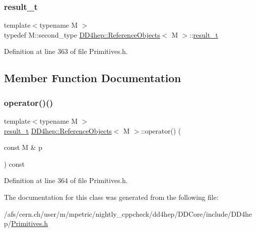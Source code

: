 \subsubsection{\texorpdfstring{result\+\_\+t}{result\_t}}
{\footnotesize\ttfamily template$<$typename M $>$ \\
typedef M\+::second\+\_\+type \hyperlink{class_d_d4hep_1_1_reference_objects}{D\+D4hep\+::\+Reference\+Objects}$<$ M $>$\+::\hyperlink{class_d_d4hep_1_1_reference_objects_a32009de947d7ac402ba08bf9a626c5aa}{result\+\_\+t}}



Definition at line 363 of file Primitives.\+h.



\subsection{Member Function Documentation}
\hypertarget{class_d_d4hep_1_1_reference_objects_a83c729cd863b298a0857bc859df124a0}{}\label{class_d_d4hep_1_1_reference_objects_a83c729cd863b298a0857bc859df124a0} 
\subsubsection{\texorpdfstring{operator()()}{operator()()}}
{\footnotesize\ttfamily template$<$typename M $>$ \\
\hyperlink{class_d_d4hep_1_1_reference_objects_a32009de947d7ac402ba08bf9a626c5aa}{result\+\_\+t} \hyperlink{class_d_d4hep_1_1_reference_objects}{D\+D4hep\+::\+Reference\+Objects}$<$ M $>$\+::operator() (\begin{DoxyParamCaption}\item[{const M \&}]{p }\end{DoxyParamCaption}) const\hspace{0.3cm}{\ttfamily [inline]}}



Definition at line 364 of file Primitives.\+h.



The documentation for this class was generated from the following file\+:\begin{DoxyCompactItemize}
\item 
/afs/cern.\+ch/user/m/mpetric/nightly\+\_\+cppcheck/dd4hep/\+D\+D\+Core/include/\+D\+D4hep/\hyperlink{_primitives_8h}{Primitives.\+h}\end{DoxyCompactItemize}
